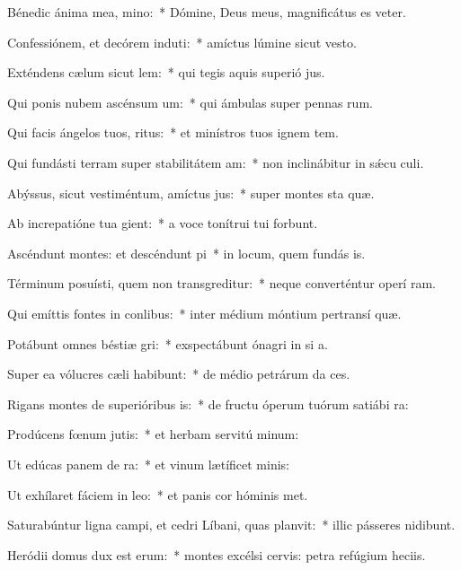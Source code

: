 \item Bénedic ánima mea, mino:~* Dómine, Deus meus, magnificátus es veter.
\item Confessiónem, et decórem induti:~* amíctus lúmine sicut vesto.
\item Exténdens cælum sicut lem:~* qui tegis aquis superió jus.
\item Qui ponis nubem ascénsum um:~* qui ámbulas super pennas rum.
\item Qui facis ángelos tuos, ritus:~* et minístros tuos ignem tem.
\item Qui fundásti terram super stabilitátem am:~* non inclinábitur in sǽcu culi.
\item Abýssus, sicut vestiméntum, amíctus jus:~* super montes sta quæ.
\item Ab increpatióne tua gient:~* a voce tonítrui tui forbunt.
\item Ascéndunt montes: et descéndunt pi~* in locum, quem fundás is.
\item Términum posuísti, quem non transgreditur:~* neque converténtur operí ram.
\item Qui emíttis fontes in conlibus:~* inter médium móntium pertransí quæ.
\item Potábunt omnes béstiæ gri:~* exspectábunt ónagri in si a.
\item Super ea vólucres cæli habibunt:~* de médio petrárum da ces.
\item Rigans montes de superióribus is:~* de fructu óperum tuórum satiábi ra:
\item Prodúcens fœnum jutis:~* et herbam servitú minum:
\item Ut edúcas panem de ra:~* et vinum lætíficet  minis:
\item Ut exhílaret fáciem in leo:~* et panis cor hóminis met.
\item Saturabúntur ligna campi, et cedri Líbani, quas planvit:~* illic pásseres nidibunt.
\item Heródii domus dux est erum:~* montes excélsi cervis: petra refúgium heciis.
